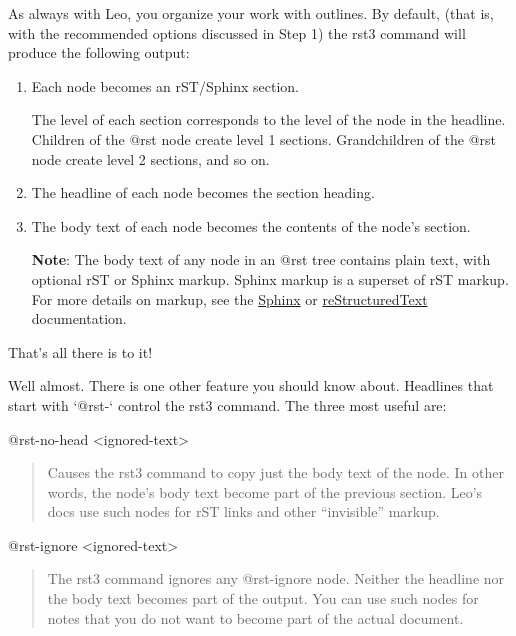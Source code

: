 \documentclass[a4paper,10pt,english]{sphinxmanual}
\begin{document}
As always with Leo, you organize your work with outlines. By default, (that is,
with the recommended options discussed in Step 1) the rst3 command will produce
the following output:
\begin{enumerate}
\item {} 
Each node becomes an rST/Sphinx section.

The level of each section corresponds to the level of the node in the
headline. Children of the @rst node create level 1 sections. Grandchildren of
the @rst node create level 2 sections, and so on.

\item {} 
The headline of each node becomes the section heading.

\item {} 
The body text of each node becomes the contents of the node's section.

\textbf{Note}: The body text of any node in an @rst tree contains plain text,
with optional rST or Sphinx markup. Sphinx markup is a superset of rST
markup. For more details on markup, see the \href{http://sphinx.pocoo.org/}{Sphinx} or \href{http://docutils.sourceforge.net/rst.html}{reStructuredText}
documentation.

\end{enumerate}

That's all there is to it!

Well almost. There is one other feature you should know about. Headlines that
start with `@rst-` control the rst3 command.  The three most useful are:
\begin{description}
\end{description}

@rst-no-head \textless{}ignored-text\textgreater{}
\begin{quote}

Causes the rst3 command to copy just the body text of the node. In other
words, the node's body text become part of the previous section. Leo's docs
use such nodes for rST links and other ``invisible'' markup.
\end{quote}

@rst-ignore \textless{}ignored-text\textgreater{}
\begin{quote}

The rst3 command ignores any @rst-ignore node. Neither the headline nor the
body text becomes part of the output. You can use such nodes for notes that
you do not want to become part of the actual document.
\end{quote}
\end{document}
